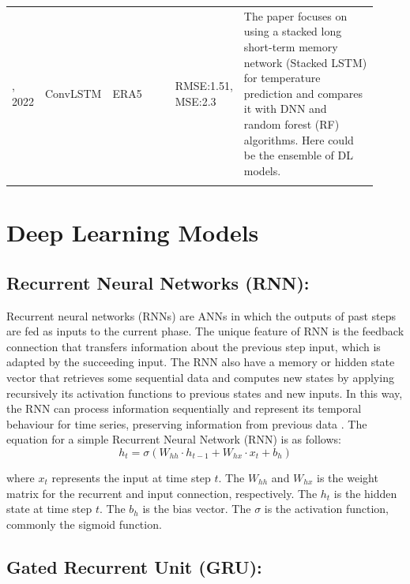 \documentclass[sn-mathphys,Numbered]{sn-jnl}
\theoremstyle{thmstyleone}
\theoremstyle{thmstyletwo}
\theoremstyle{thmstylethree}
\begin{document}
\begin{table}[!h]
\begin{tabular}{ p{0.05\linewidth} p{0.1\linewidth} p{0.2\linewidth} p{0.12\linewidth} p{0.45\linewidth} }
\cite{gong2022temperature}, 2022 & ConvLSTM & ERA5 &RMSE:1.51, MSE:2.3 & The paper focuses on using a stacked long short-term memory network (Stacked LSTM) for temperature prediction and compares it with DNN and random forest (RF) algorithms. Here could be the ensemble of DL models.\\
\botrule
\end{tabular}
\end{table}
\section{Deep Learning Models}

\subsection {Recurrent Neural Networks (RNN):}
Recurrent neural networks (RNNs) are ANNs in which the outputs of past steps are fed as inputs to the current phase. The unique feature of RNN is the feedback connection that transfers information about the previous step input, which is adapted by the succeeding input. The RNN also have a memory or hidden state vector that retrieves some sequential data and computes new states by applying recursively its activation functions to previous states and new inputs. In this way, the RNN can process information sequentially and represent its temporal behaviour for time series, preserving information from previous data \cite{thi2020deep}.
The equation for a simple Recurrent Neural Network (RNN) is as follows:
\begin{equation}
h_t=\sigma(W_{hh} \cdot h_{t-1} + W_{hx} \cdot x_t + b_h)
\end{equation}

where \(x_t\) represents the input at time step \(t\). The
\(W_{hh}\) and \(W_{hx}\) is the weight matrix for the recurrent and input connection, respectively. The
\(h_t\) is the hidden state at time step \(t\). The
\(b_h\) is the bias vector. The
\(\sigma\) is the activation function, commonly the sigmoid function.

\subsection{Gated Recurrent Unit (GRU):}
\end{document}
